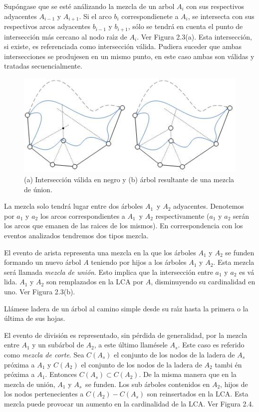\documentclass[12pt,english]{report}
\begin{document}
Sup\'{o}ngase que se est\'{e} an\'{a}lizando la mezcla de un arbol $A_{i}$
con sus respectivos adyacentes $A_{i-1}$ y $A_{i+1}$. Si el arco $b_{i}$
correspondienete a $A_{i}$, se intersecta con sus respectivos arcos
adyacentes $b_{i-1}$ y $b_{i+1}$, s\'{o}lo se tendr\'{a} en cuenta el punto
de intersecci\'{o}n m\'{a}s cercano al nodo ra\'{\i}z de $A_{i}$. Ver Figura
2.3(a). Esta intersecci\'{o}n, si existe, es referenciada como intersecci\'{o}n
v\'{a}lida. Pudiera suceder que ambas intersecciones se produjesen en un
mismo punto, en este caso ambas son v\'{a}lidas y tratadas secuencialmente. 

\begin{figure}[htbp]
\begin{center}
\includegraphics{inter5.jpg}
\end{center}
\caption{(a) Intersecci\'on v\'alida en negro y (b) \'arbol resultante de una mezcla de \'union.}
\end{figure}

La mezcla solo tendr\'{a} lugar entre dos \'{a}rboles $A_{1}$\ y $A_{2}$
adyacentes. Denotemos por $a_{1}$ y $a_{2}$ los arcos correspondientes a $%
A_{1}$\ y $A_{2}$ respectivamente ($a_1$ y $a_2$ ser\'an los arcos que emanen de las raices de los mismos). En correspondencia con los eventos
analizados tendremos dos tipos mezcla. 

El evento de arista representa una mezcla en la que los \'{a}rboles $A_{1}$
y $A_{2}$ se funden formando un nuevo \'{a}rbol $A$ teniendo por hijos a los 
\'{a}rboles $A_{1}$ y $A_{2}$. Esta mezcla ser\'{a} llamada \emph{mezcla de
uni\'{o}n}. Esto implica que la intersecci\'{o}n entre $a_{1}$ y $a_{2}$ es v\'{a}%
lida. $A_{1}$ y $A_{2}$ son remplazados en la LCA por $A$, disminuyendo su
cardinalidad en uno. Ver Figura 2.3(b).

Ll\'{a}mese ladera de un \'{a}rbol al camino simple desde su ra\'{\i}z hasta
la primera o la \'{u}ltima de sus hojas.

El evento de divisi\'{o}n es representado, sin p\'{e}rdida de generalidad,
por la mezcla entre $A_{1}$ y un sub\'{a}rbol de $A_{2}$, a este \'{u}ltimo
llam\'{e}sele $A_{s}$. Este caso es referido como \emph{mezcla de corte}.
Sea $C(A_{s})$ el conjunto de los nodos de la ladera de $A_{s}$ pr\'{o}xima
a $A_{1}$ y $C(A_{2})$ el conjunto de los nodos de la ladera de $A_{2}$ tambi%
\'{e}n pr\'{o}xima a $A_{1}$. Entonces $C(A_{s}) \subset C(A_{2})$. De la
misma manera que en la mezcla de uni\'on, $A_{1}$ y $A_{s}$\ se funden. Los sub%
\'{a}rboles contenidos en $A_{2}$, hijos de los nodos pertenecientes a $%
C(A_{2})-C(A_{s})$ son reinsertados en la LCA. Esta mezcla puede provocar un
aumento en la cardinalidad de la LCA. Ver Figura 2.4.
\end{document}

